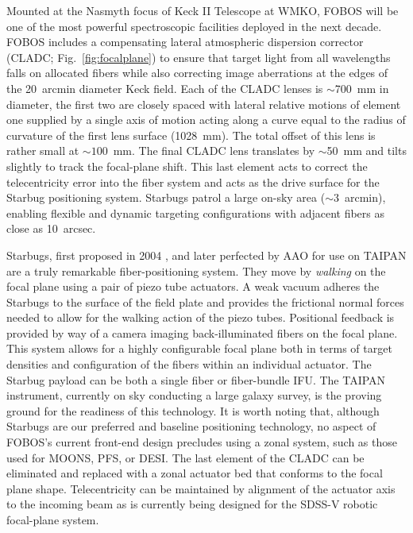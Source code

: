 Mounted at the Nasmyth focus of Keck II Telescope at WMKO, FOBOS will
be one of the most powerful spectroscopic facilities deployed in the
next decade. FOBOS includes a compensating lateral atmospheric
dispersion corrector (CLADC; Fig.~\ref{fig:focalplane}) to ensure
that target light from all wavelengths falls on allocated fibers
while also correcting image aberrations at the edges of the 20~arcmin
diameter Keck field. Each of the CLADC lenses is $\sim$700~mm in
diameter, the first two are closely spaced with lateral relative
motions of element one supplied by a single axis of motion acting
along a curve equal to the radius of curvature of the first lens
surface (1028~mm). The total offset of this lens is rather small at
$\sim1$00~mm. The final CLADC lens translates by $\sim$50~mm and
tilts slightly to track the focal-plane shift. This last element acts to
correct the telecentricity error into the fiber system and acts as the
drive surface for the Starbug positioning system.
Starbugs patrol a large on-sky area ($\sim$3~arcmin), enabling
flexible and dynamic targeting configurations with adjacent fibers as
close as 10~arcsec.


Starbugs, first proposed in 2004 \citep{2004SPIE.5495..600M}, and
later perfected by AAO for use on TAIPAN \citep{2016SPIE.9912E..1WS}
are a truly remarkable fiber-positioning system. They move by {\it
walking} on the focal plane using a pair of piezo tube actuators. A
weak vacuum adheres the Starbugs to the surface of the field plate
and provides the frictional normal forces needed to allow for the
walking action of the piezo tubes. Positional feedback is provided by
way of a camera imaging back-illuminated fibers on the focal plane.
This system allows for a highly configurable focal plane both in
terms of target densities and configuration of the fibers within an
individual actuator. The Starbug payload can be both a single fiber or
fiber-bundle IFU. The TAIPAN instrument,
currently on sky conducting a large galaxy survey, is the proving ground
for the readiness of this technology. It is worth noting that,
although Starbugs are our preferred and baseline positioning
technology, no aspect of FOBOS's current front-end design precludes
using a zonal system, such as those used for MOONS, PFS, or DESI. The
last element of the CLADC can be eliminated and replaced with a zonal
actuator bed that conforms to the focal plane shape. Telecentricity
can be maintained by alignment of the actuator axis to the incoming
beam as is currently being designed for the SDSS-V robotic
focal-plane system.

